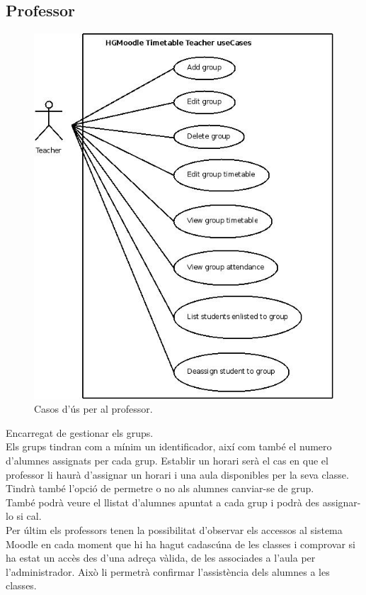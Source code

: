 \documentclass[a4paper]{report}  %
\begin{document}
\subsection{Professor}
		\begin{figure}[H] %
		\begin{center}
		\includegraphics[width=14cm,keepaspectratio]{img/UseCases-Teacher-rf.jpg}
		\caption[List caption]{Casos d'ús per al professor.}
		\label{fig:UseCases-Teacher-rf}
		\end{center}
		\end{figure}
Encarregat de gestionar els grups. \\
Els grups tindran com a mínim un identificador, així com també el numero d’alumnes assignats per cada grup. Establir un horari  serà el cas en que el professor li haurà d’assignar un horari i una aula disponibles per la seva classe. Tindrà també l’opció de permetre o no als alumnes canviar-se de grup.\\
També podrà veure el llistat d'alumnes apuntat a cada grup i podrà des assignar-lo si cal.\\
Per últim els professors tenen la possibilitat d'observar els accessos al sistema Moodle en cada moment que hi ha hagut cadascúna de les classes i comprovar si ha estat un accès des d'una adreça vàlida, de les associades a l'aula per l'administrador. Això li permetrà confirmar l'assistència dels alumnes a les classes.\\
\end{document}
